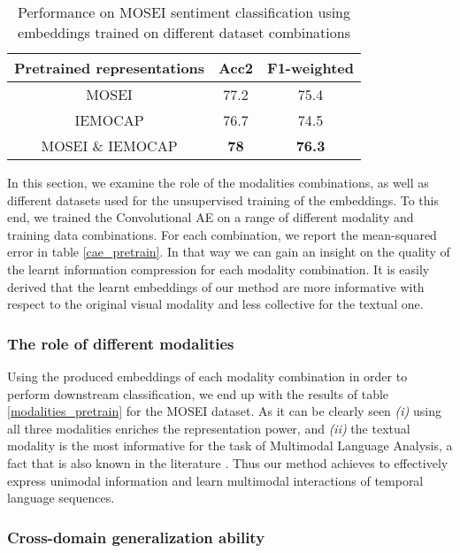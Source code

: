 \begin{table}
\centering
\caption{Performance on MOSEI sentiment classification using embeddings trained on different dataset combinations\label{dataset_pretrain}}
\begin{tabular}{ccc}
\multicolumn{1}{l}{{ \textbf{Pretrained representations}}} & { \textbf{Acc2}}  & { \textbf{F1-weighted}} \\ \hline
{ MOSEI}                                                   & { 77.2}          & { 75.4}                \\
{ IEMOCAP}                                                 & { 76.7}          & { 74.5}                \\
{ MOSEI \& IEMOCAP}                                        & { \textbf{78}} & { \textbf{76.3}}      
\end{tabular}

\end{table}


In this section, we examine the role of the modalities combinations, as well as different datasets used for the unsupervised training of the embeddings. To this end, we trained the Convolutional AE on a range of different modality  and training data combinations. For each combination, we report the mean-squared error in table \ref{cae_pretrain}. In that way we can gain an insight on the quality of the learnt information compression for each modality combination. It is easily derived that the learnt embeddings of our method are more informative with respect to the original visual modality and less collective for the textual one.


\subsubsection{The role of different modalities}

Using the produced embeddings of each modality combination in order to perform downstream classification, we end up with the results of table \ref{modalities_pretrain} for the MOSEI dataset. As it can be clearly seen \textit{(i)} using all three modalities enriches the representation power, and \textit{(ii)} the textual modality is the most informative for the task of Multimodal Language Analysis, a fact that is also known in the literature \cite{sun2020learning}. Thus our method achieves to effectively express unimodal information and learn multimodal interactions of temporal language sequences. 

\subsubsection{Cross-domain generalization ability}\label{cross-dataset}


